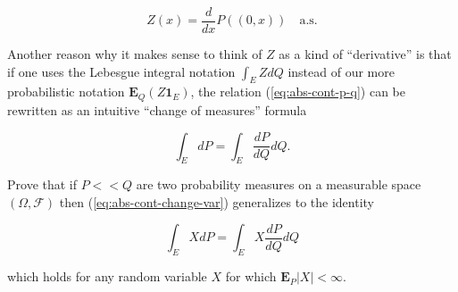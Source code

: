 \[
Z(x) = \frac{d}{dx} P((0,x)) \quad\textrm{a.s.}
\]

\noindent Another reason why it makes sense to think of $Z$ as
a kind of ``derivative'' is that if one uses the
Lebesgue integral notation $\int_E Z dQ$ instead of
our more probabilistic notation
$\mathbf{E}_{Q}(Z\mathbf{1}_E)$, the relation
(\ref{eq:abs-cont-p-q}) can be rewritten as an intuitive
``change of measures'' formula

\begin{equation*} \tag{6}\label{eq:abs-cont-change-var}
\int_E dP = \int_E \frac{dP}{dQ} dQ.
\end{equation*}

\begin{xexercise}
Prove that if $P<<Q$ are two probability measures on
a measurable space $(\Omega, \mathcal{F})$ then
(\ref{eq:abs-cont-change-var}) generalizes to the identity

\[
\int_E X dP = \int_E X \frac{dP}{dQ} dQ
\]

\noindent which holds for any random variable $X$ for which
$\mathbf{E}_P|X|<\infty$.
\end{xexercise}

